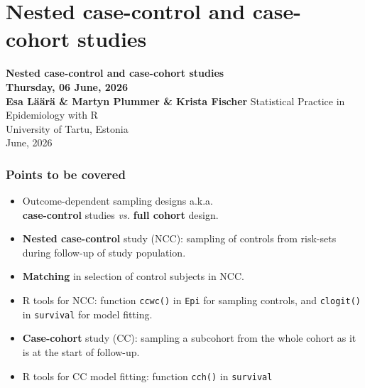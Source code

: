 \documentclass[12pt,dvipsnames,t,handout%
,aspectratio=169%
]{beamer}
\newcommand{\currentlecture}{}
\newcommand{\banner}[3]{
\addtocounter{framenumber}{-0}
\section{#1}
\renewcommand{\currentlecture}{#1}
\begin{frame}[plain]
{\usebeamercolor[fg]{frametitle}
 \LARGE \bf #1\\
 \large \sf #2\\
 \large \bf #3}
\vfill
Statistical Practice in Epidemiology with R\\
University of Tartu, Estonia\\
June, 2026\\
\end{frame}
%
}
\begin{document}



 \banner{Nested case-control and case-cohort studies}%
       {Thursday, 06 June, 2026  }%
        {Esa Läärä \& Martyn Plummer \& Krista Fischer}

\begin{frame}
\frametitle{Points to be covered}

\begin{itemize}
\item
Outcome-dependent sampling designs a.k.a. \\ 
\textbf{case-control} studies {\it vs.} 
\textbf{full cohort} design.
\medskip
\item
\textbf{Nested case-control} study (NCC): sampling 
of controls from risk-sets during follow-up of study population.
\medskip
\item
\textbf{Matching} in selection of control subjects in NCC.
\medskip
\item
R tools for NCC: function {\tt ccwc()}  in {\tt Epi} 
for sampling controls, and
 {\tt clogit()} in {\tt survival} 
 for model fitting.
\medskip
\item
\textbf{Case-cohort} study (CC): sampling a subcohort from the
whole cohort as it is at the start of follow-up.
\medskip
\item
R tools for CC model fitting: function {\tt cch()} in \texttt{survival}
\end{itemize}
\end{frame}
\end{document}
